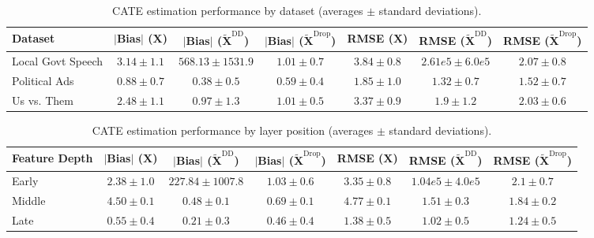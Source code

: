     \begin{table}[ht!]
    \centering
    \small
    \caption{CATE estimation performance by dataset (averages $\pm$ standard deviations).}
    \begin{sc}
    \begin{tabular}{lcccccc}
    \toprule
    \textbf{Dataset} & \textbf{$|$Bias$|$ ($\mathbf{X}$)} & \textbf{$|$Bias$|$ ($\mathbf{\widetilde{X}}^{\textrm{DD}}$)} & \textbf{$|$Bias$|$ ($\mathbf{\widetilde{X}}^{\textrm{Drop}}$)} & \textbf{RMSE ($\mathbf{X}$)} & \textbf{RMSE ($\mathbf{\widetilde{X}}^{\textrm{DD}}$)} & \textbf{RMSE ($\mathbf{\widetilde{X}}^{\textrm{Drop}}$)}\\
    \midrule
    Local Govt Speech & $3.14 \pm 1.1$ & $568.13 \pm 1531.9$ & $1.01 \pm 0.7$ & $3.84 \pm 0.8$ & $2.61e5 \pm 6.0e5$ & $2.07 \pm 0.8$\\Political Ads & $\mathbf{0.88 \pm 0.7}$ & $\mathbf{0.38 \pm 0.5}$ & $\mathbf{0.59 \pm 0.4}$ & $\mathbf{1.85 \pm 1.0}$ & $\mathbf{1.32 \pm 0.7}$ & $\mathbf{1.52 \pm 0.7}$\\Us vs. Them & $2.48 \pm 1.1$ & $0.97 \pm 1.3$ & $1.01 \pm 0.5$ & $3.37 \pm 0.9$ & $1.9 \pm 1.2$ & $2.03 \pm 0.6$\\
    \bottomrule
    \end{tabular}
    \end{sc}
    \end{table}


    \begin{table}[ht!]
    \centering
    \small
    \caption{CATE estimation performance by layer position (averages $\pm$ standard deviations).}
    \begin{sc}
    \begin{tabular}{lcccccc}
    \toprule
    \textbf{Feature Depth} & \textbf{$|$Bias$|$ ($\mathbf{X}$)} & \textbf{$|$Bias$|$ ($\mathbf{\widetilde{X}}^{\textrm{DD}}$)} & \textbf{$|$Bias$|$ ($\mathbf{\widetilde{X}}^{\textrm{Drop}}$)} & \textbf{RMSE ($\mathbf{X}$)} & \textbf{RMSE ($\mathbf{\widetilde{X}}^{\textrm{DD}}$)} & \textbf{RMSE ($\mathbf{\widetilde{X}}^{\textrm{Drop}}$)}\\
    \midrule
    Early & $2.38 \pm 1.0$ & $227.84 \pm 1007.8$ & $1.03 \pm 0.6$ & $3.35 \pm 0.8$ & $1.04e5 \pm 4.0e5$ & $2.1 \pm 0.7$\\
    Middle & $4.50 \pm 0.1$ & $0.48 \pm 0.1$ & $0.69 \pm 0.1$ & $4.77 \pm 0.1$ & $1.51 \pm 0.3$ & $1.84 \pm 0.2$\\
    Late & $\mathbf{0.55 \pm 0.4}$ & $\mathbf{0.21 \pm 0.3}$ & $\mathbf{0.46 \pm 0.4}$ & $\mathbf{1.38 \pm 0.5}$ & $\mathbf{1.02 \pm 0.5}$ & $\mathbf{1.24 \pm 0.5}$\\
    \bottomrule
    \end{tabular}
    \end{sc}
    \end{table}
